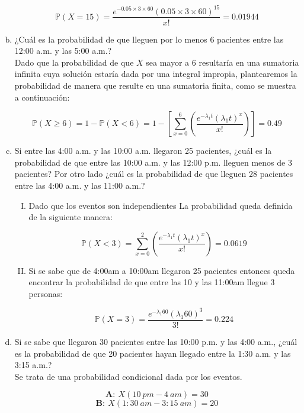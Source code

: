 \documentclass[11pt, spanish]{article}
\begin{document}
\begin{enumerate}[(a)]
$$\mathbb{P}(X = 15) =  \frac{e^{-0.05 \times 3 \times 60}(0.05 \times 3 \times 60)^{15}}{x!} = 0.01944$$

\item ¿Cuál es la probabilidad de que lleguen por lo menos 6 pacientes entre las 12:00
a.m. y las 5:00 a.m.?\\

Dado que la probabilidad de que $X$ sea mayor a 6 resultaría en una sumatoria
infinita cuya solución estaría dada por una integral impropia, plantearemos la
probabilidad de manera que resulte en una sumatoria finita, como se muestra a
continuación:

$$\mathbb{P}(X \geq 6) = 1 - \mathbb{P}(X < 6)  = 1 - \left[ \sum_{x = 0}^{6} \left( \frac{e^{-\lambda_{1} t}(\lambda_{1} t)^{x}}{x!} \right)\right] = 0.49$$

\item Si entre las 4:00 a.m. y las 10:00 a.m. llegaron 25 pacientes, ¿cuál es la
probabilidad de que entre las 10:00 a.m. y las 12:00 p.m. lleguen menos de 3 pacientes? Por
otro lado ¿cuál es la probabilidad de que lleguen 28 pacientes entre las 4:00 a.m. y las 11:00
a.m.?\\

\begin{enumerate}[(I)]

\item Dado que los eventos son independientes La probabilidad queda definida de la
siguiente manera:

 $$\mathbb{P}(X < 3) = \sum_{x = 0}^{2} \left( \frac{e^{-\lambda_{1} t}(\lambda_{1} t)^{x}}{x!} \right) = 0.0619$$
 
\item Si se sabe que de 4:00am a 10:00am llegaron 25 pacientes entonces queda
encontrar la probabilidad de que entre las 10 y las 11:00am llegue 3 personas:

 $$\mathbb{P}(X = 3) =  \frac{e^{-\lambda_{1} 60}(\lambda_{1} 60)^{3}}{3!} = 0.224 $$

\end{enumerate}

\item Si se sabe que llegaron 30 pacientes entre las 10:00 p.m. y las 4:00 a.m., ¿cuál
es la probabilidad de que 20 pacientes hayan llegado entre la 1:30 a.m. y las 3:15 a.m.?\\

Se trata de una probabilidad condicional dada por los eventos.

$$\textbf{A}:\ X(10 \ pm-4 \ am) = 30$$
$$\textbf{B}:\ X(1:30 \ am-3:15 \ am) = 20$$


\end{enumerate}
\end{document}
